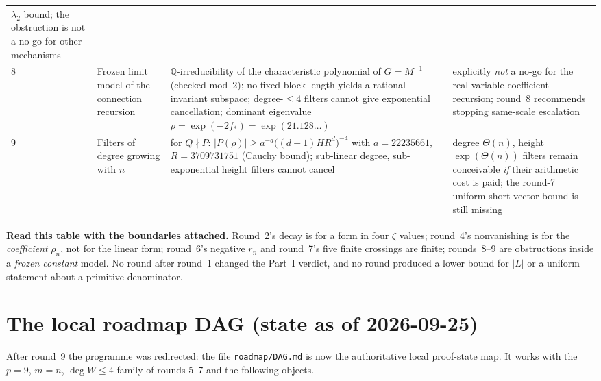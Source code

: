 \documentclass[11pt]{article}
\begin{document}
\begin{longtable}{@{}p{}p{}p{}p{}@{}}
    $\lambda_2$ bound; the obstruction is not a no-go for other mechanisms \\
8 & Frozen limit model of the connection recursion & $\mathbb{Q}$-irreducibility of the
    characteristic polynomial of $G=M^{-1}$ (checked mod~$2$); no fixed block length yields a
    rational invariant subspace; degree-$\le4$ filters cannot give exponential cancellation;
    dominant eigenvalue $\rho=\exp(-2f_*)=\exp(21.128\ldots)$ & explicitly \emph{not} a no-go for the
    real variable-coefficient recursion; round~8 recommends stopping same-scale escalation \\
9 & Filters of degree growing with $n$ & for $Q\nmid P$: $|P(\rho)|\ge a^{-d}\bigl((d+1)HR^{d}\bigr)^{-4}$
    with $a=22235661$, $R=3709731751$ (Cauchy bound); sub-linear degree, sub-exponential height
    filters cannot cancel & degree $\Theta(n)$, height $\exp(\Theta(n))$ filters remain conceivable
    \emph{if} their arithmetic cost is paid; the round-7 uniform short-vector bound is still missing \\
\bottomrule
\end{longtable}

\noindent\textbf{Read this table with the boundaries attached.} Round~2's decay is for a form in
four $\zeta$ values; round~4's nonvanishing is for the \emph{coefficient} $\rho_n$, not for the
linear form; round~6's negative $r_n$ and round~7's five finite crossings are finite; rounds~8--9
are obstructions inside a \emph{frozen constant} model. No round after round~1 changed the
Part~I verdict, and no round produced a lower bound for $|L|$ or a uniform statement about a
primitive denominator.

\section{The local roadmap DAG (state as of 2026-09-25)}
\label{sec:roadmap}

After round~9 the programme was redirected: the file \texttt{roadmap/DAG.md} is now the
authoritative local proof-state map. It works with the $p=9$, $m=n$, $\deg W\le4$ family of rounds
5--7 and the following objects.
\end{document}
